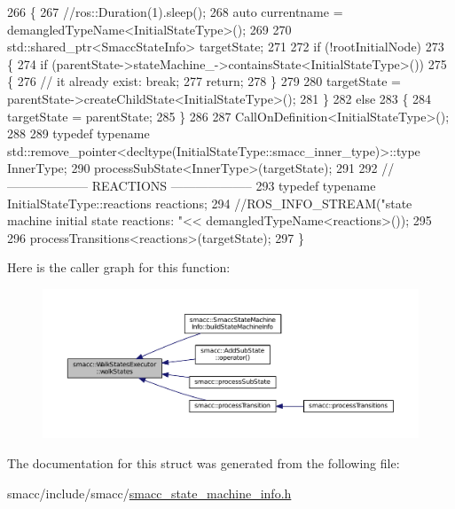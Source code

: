 \begin{DoxyCode}
266 \{
267     \textcolor{comment}{//ros::Duration(1).sleep();}
268     \textcolor{keyword}{auto} currentname = demangledTypeName<InitialStateType>();
269 
270     std::shared\_ptr<SmaccStateInfo> targetState;
271 
272     \textcolor{keywordflow}{if} (!rootInitialNode)
273     \{
274         \textcolor{keywordflow}{if} (parentState->stateMachine\_->containsState<InitialStateType>())
275         \{
276             \textcolor{comment}{// it already exist: break;}
277             \textcolor{keywordflow}{return};
278         \}
279 
280         targetState = parentState->createChildState<InitialStateType>();
281     \}
282     \textcolor{keywordflow}{else}
283     \{
284         targetState = parentState;
285     \}
286     
287     CallOnDefinition<InitialStateType>();
288 
289     \textcolor{keyword}{typedef} \textcolor{keyword}{typename} std::remove\_pointer<decltype(InitialStateType::smacc\_inner\_type)>::type InnerType;
290     processSubState<InnerType>(targetState);
291 
292     \textcolor{comment}{// -------------------- REACTIONS --------------------}
293     \textcolor{keyword}{typedef} \textcolor{keyword}{typename} InitialStateType::reactions reactions;
294     \textcolor{comment}{//ROS\_INFO\_STREAM("state machine initial state reactions: "<< demangledTypeName<reactions>());}
295 
296     processTransitions<reactions>(targetState);
297 \}
\end{DoxyCode}


Here is the caller graph for this function\+:
\nopagebreak
\begin{figure}[H]
\begin{center}
\leavevmode
\includegraphics[width=350pt]{structsmacc_1_1WalkStatesExecutor_a11a2b02eafb62ec298bcf5ffbb32848b_icgraph}
\end{center}
\end{figure}




The documentation for this struct was generated from the following file\+:\begin{DoxyCompactItemize}
\item 
smacc/include/smacc/\hyperlink{smacc__state__machine__info_8h}{smacc\+\_\+state\+\_\+machine\+\_\+info.\+h}\end{DoxyCompactItemize}
